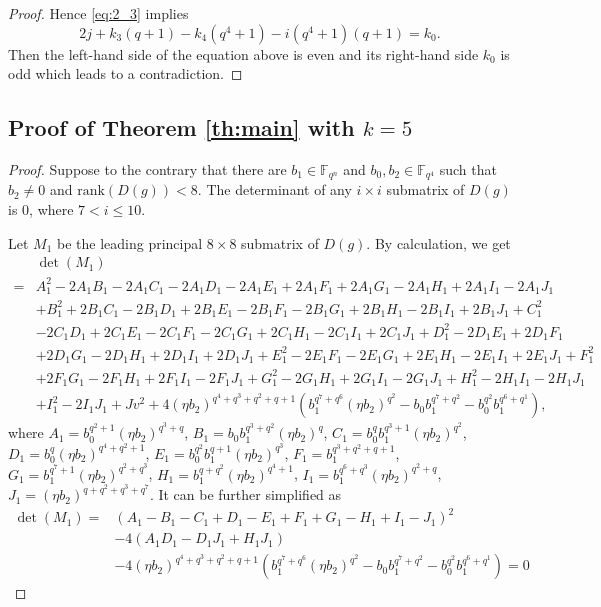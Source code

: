 \documentclass{amsart}
\theoremstyle{plain}
\theoremstyle{definition}
\newcommand{\fqn}{\mathbb{F}_{q^n}}
\newcommand{\rank}{\mathrm{rank}}
\begin{document}
\begin{proof}
		Hence \eqref{eq:2_3} implies 
		\[2j+k_3(q+1)-k_4(q^4+1)-i(q^4+1)(q+1)=k_0.\]
		Then the left-hand side of the equation above is even and its right-hand side $k_0$ is odd which leads to a contradiction.
	\end{proof}
	
	
	\subsection{Proof of Theorem \ref{th:main} with $k=5$}\label{subsec:k=5}
	\begin{proof}
		Suppose to the contrary that there are $b_1\in \fqn $ and $b_0,b_2\in\mathbb{F}_{q^4}$ such that $b_2\neq0$ and  $\rank(D( g))<8$. The determinant of any 	 $i\times i$ submatrix of $D( g)$ is $0$, where $7<i\leq 10$. 
		
		Let $M_1$ be the leading principal $8\times 8$ submatrix of $D( g)$. 	By calculation, we get
		\begin{align*}
			&\det(M_1)\\
			=& A_1^2-2A_1B_1-2A_1C_1-2A_1D_1-2A_1E_1+2A_1F_1+2A_1G_1-2A_1H_1+2A_1I_1-2A_1J_1\\
			&+B_1^2+2B_1C_1-2B_1D_1+2B_1E_1-2B_1F_1-2B_1G_1+2B_1H_1-2B_1I_1+2B_1J_1+C_1^2\\
			&-2C_1D_1+2C_1E_1-2C_1F_1-2C_1G_1+2C_1H_1-2C_1I_1+2C_1J_1+D_1^2-2D_1E_1+2D_1F_1\\
			&+2D_1G_1-2D_1H_1+2D_1I_1+2D_1J_1+E_1^2-2E_1F_1-2E_1G_1+2E_1H_1-2E_1I_1+2E_1J_1+F_1^2\\
			&+2F_1G_1-2F_1H_1+2F_1I_1-2F_1J_1+G_1^2-2G_1H_1+2G_1I_1-2G_1J_1+H_1^2-2H_1I_1-2H_1J_1\\
			&+I_1^2-2I_1J_1+Jv^2+4(\eta b_2)^{q^4+q^3+q^2+q+1}(b_1^{q^7+q^6}(\eta b_2)^{q^2}-b_0b_1^{q^7+q^2}-b_0^{q^2}b_1^{q^6+q^1}),
		\end{align*}
		where $A_1=b_0^{q^2+1}(\eta b_2)^{q^3+q}$, $B_1=b_0b_1^{q^3+q^2}(\eta b_2)^{q}$, $C_1=b_0^qb_1^{q^3+1}(\eta b_2)^{q^2}$, $D_1=b_0^q(\eta b_2)^{q^4+q^2+1}$, $E_1=b_0^{q^2}b_1^{q+1}(\eta b_2)^{q^3}$, $F_1=b_1^{q^3+q^2+q+1}$, $G_1=b_1^{q^7+1}(\eta b_2)^{q^2+q^3}$, $H_1=b_1^{q+q^2}(\eta b_2)^{q^4+1}$, $I_1=b_1^{q^6+q^3}(\eta b_2)^{q^2+q}$, $J_1=(\eta b_2)^{q+q^2+q^3+q^7}$. It can be further simplified as
		\begin{align}
			\nonumber
			\det(M_1) = &(A_1-B_1-C_1+D_1-E_1+F_1+G_1-H_1+I_1-J_1)^2\\
			\label{eq:n_10}
			&-4(A_1D_1-D_1J_1+H_1J_1)\\
			\nonumber
			&-4(\eta b_2)^{q^4+q^3+q^2+q+1}\left(b_1^{q^7+q^6}(\eta b_2)^{q^2}
			-b_0b_1^{q^7+q^2}-b_0^{q^2}b_1^{q^6+q^1}\right)=0	
		\end{align}
		

\end{proof}
\end{document}
